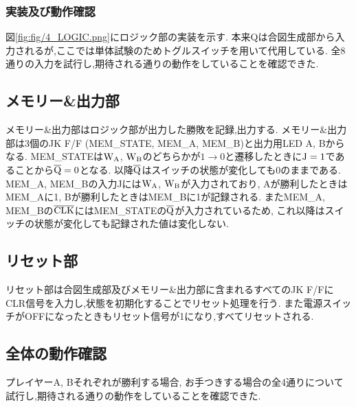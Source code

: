\subsubsection{実装及び動作確認}
図\ref{fig:fig/4_LOGIC.png}にロジック部の実装を示す.
本来Qは合図生成部から入力されるが,ここでは単体試験のためトグルスイッチを用いて代用している.
全8通りの入力を試行し,期待される通りの動作をしていることを確認できた.
\subsection{メモリー\&出力部}
メモリー\&出力部はロジック部が出力した勝敗を記録,出力する.
メモリー\&出力部は3個のJK F/F (MEM\_STATE, MEM\_A, MEM\_B)と出力用LED A, Bからなる.
MEM\_STATEは$\rm W_A$, $\rm W_B$のどちらかが$1\rightarrow 0$と遷移したときに$\rm J=1$であることから$\overline{\rm Q}=0$となる.
以降$\overline{\rm Q}$はスイッチの状態が変化しても0のままである.
MEM\_A, MEM\_Bの入力Jには$\rm W_A$, $\rm W_B$が入力されており,
Aが勝利したときはMEM\_Aに1,
Bが勝利したときはMEM\_Bに1が記録される.
またMEM\_A, MEM\_Bの$\overline{\rm CLK}$にはMEM\_STATEの$\overline{\rm Q}$が入力されているため,
これ以降はスイッチの状態が変化しても記録された値は変化しない.
\subsection{リセット部}
リセット部は合図生成部及びメモリー\&出力部に含まれるすべてのJK F/FにCLR信号を入力し,状態を初期化することでリセット処理を行う.
また電源スイッチがOFFになったときもリセット信号が1になり,すべてリセットされる.
\subsection{全体の動作確認}
プレイヤーA, Bそれぞれが勝利する場合, お手つきする場合の全4通りについて試行し,期待される通りの動作をしていることを確認できた.